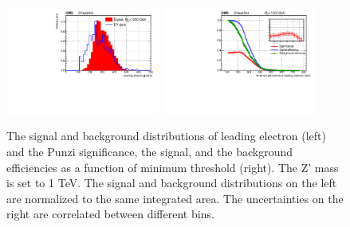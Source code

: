 \begin{figure}[htbp]
   \centering
   \includegraphics[width=0.45\textwidth]{optimization/plot_1st_pt/plot_1st_pt_input_in_Zprime_mass_1000.pdf}
   \includegraphics[width=0.45\textwidth]{optimization/plot_1st_pt/plot_1st_pt_Significance_and_efficiency_for_Zprme_M_1000.pdf}
   \caption{The signal and background distributions of leading electron \pt 
(left) and the Punzi significance, the signal, and the background efficiencies as a 
 function of minimum \pt threshold (right). The Z' mass is set to 1 TeV. The 
   signal and background distributions on the left are normalized to the same 
   integrated area. The uncertainties on the right are correlated between 
 different bins.}
   \label{fig:leadptone}
\end{figure}

